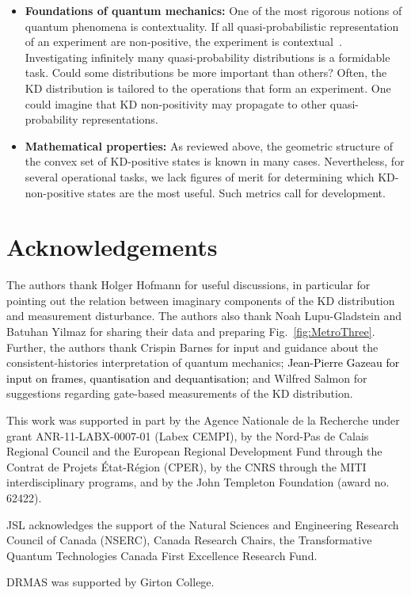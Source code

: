 \documentclass[%
 reprint,
superscriptaddress,
nofootinbib,
bibnotes,
 amsmath,amssymb,
 aps,
]{revtex4-1}
\theoremstyle{plain}
\newcommand{\nicole}[1]{\textcolor{black}{#1} }
\begin{document}
\begin{itemize}
    \item \textbf{Foundations of quantum mechanics:} One of the most rigorous notions of quantum phenomena is contextuality. 
    If all quasi-probabilistic representation of an experiment are non-positive, the experiment is contextual~\cite{spekkens2008negativity}.
    Investigating infinitely many quasi-probability distributions is a formidable task. Could some distributions be more important than others? Often, the KD distribution is tailored to the operations that form an experiment.
    One could imagine that KD non-positivity may propagate to other quasi-probability representations. 


    \item \textbf{Mathematical properties:} As reviewed above, the geometric structure of the convex set of KD-positive states is known in many cases. Nevertheless, for several operational tasks, we lack figures of merit for determining which KD-non-positive states are the most useful. Such metrics call for development.

\end{itemize}



\section{Acknowledgements}
The authors thank Holger Hofmann for useful discussions, in particular for pointing out the relation between imaginary components of the KD distribution and measurement disturbance. The authors also thank Noah Lupu-Gladstein and Batuhan Yilmaz for sharing their data and preparing Fig.~\ref{fig:MetroThree}. Further, the authors thank Crispin Barnes for input and guidance about the consistent-histories interpretation of quantum mechanics; \nicole{Jean-Pierre Gazeau for input on frames, quantisation and dequantisation;} and Wilfred Salmon for suggestions regarding gate-based measurements of the KD distribution.

This work was supported in part by the Agence Nationale de la Recherche under grant ANR-11-LABX-0007-01 (Labex CEMPI), by the Nord-Pas de Calais Regional Council and the European Regional Development Fund through the Contrat de Projets \'Etat-R\'egion (CPER), by the CNRS through the MITI interdisciplinary programs, and by the John Templeton Foundation (award no. 62422).

JSL acknowledges the support of the Natural Sciences and Engineering Research Council of Canada (NSERC), Canada Research Chairs, the Transformative Quantum Technologies Canada First Excellence Research Fund.

DRMAS was supported by Girton College.
\medskip







\end{document}
